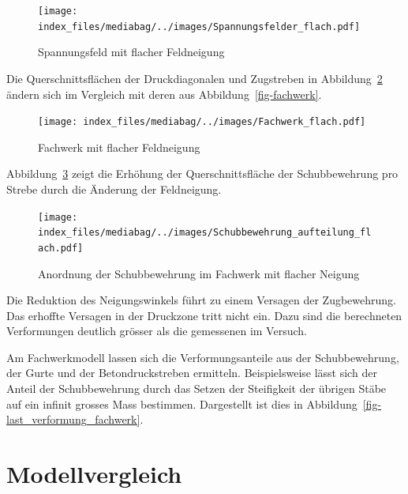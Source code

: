 \documentclass[
  letterpaper,
]{scrreprt}
\begin{document}
\begin{figure}[H]

{\centering \texttt{[image: index\_files/mediabag/../images/Spannungsfelder\_flach.pdf]}

}

\caption{\label{fig-spannungsfelder_flach}Spannungsfeld mit flacher
Feldneigung}

\end{figure}

Die Querschnittsflächen der Druckdiagonalen und Zugstreben in
Abbildung~\ref{fig-fachwerk_flach} ändern sich im Vergleich mit deren
aus Abbildung~\ref{fig-fachwerk}.

\begin{figure}[H]

{\centering \texttt{[image: index\_files/mediabag/../images/Fachwerk\_flach.pdf]}

}

\caption{\label{fig-fachwerk_flach}Fachwerk mit flacher Feldneigung}

\end{figure}

Abbildung~\ref{fig-schubbew_fw_flach} zeigt die Erhöhung der
Querschnittsfläche der Schubbewehrung pro Strebe durch die Änderung der
Feldneigung.

\begin{figure}[H]

{\centering \texttt{[image: index\_files/mediabag/../images/Schubbewehrung\_aufteilung\_flach.pdf]}

}

\caption{\label{fig-schubbew_fw_flach}Anordnung der Schubbewehrung im
Fachwerk mit flacher Neigung}

\end{figure}

Die Reduktion des Neigungswinkels führt zu einem Versagen der
Zugbewehrung. Das erhoffte Versagen in der Druckzone tritt nicht ein.
Dazu sind die berechneten Verformungen deutlich grösser als die
gemessenen im Versuch.

Am Fachwerkmodell lassen sich die Verformungsanteile aus der
Schubbewehrung, der Gurte und der Betondruckstreben ermitteln.
Beispielsweise lässt sich der Anteil der Schubbewehrung durch das Setzen
der Steifigkeit der übrigen Stäbe auf ein infinit grosses Mass
bestimmen. Dargestellt ist dies in
Abbildung~\ref{fig-last_verformung_fachwerk}.

\newpage{}

\hypertarget{modellvergleich}{%
\section{Modellvergleich}\label{modellvergleich}}
\end{document}
